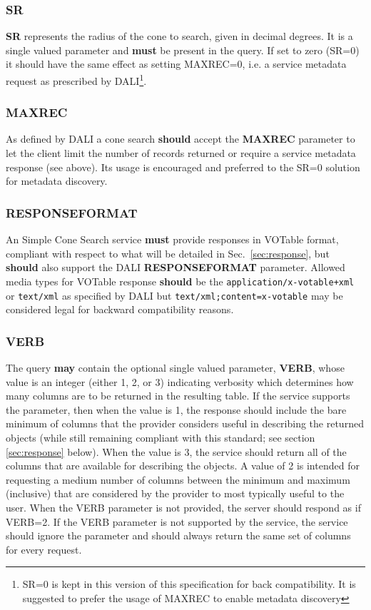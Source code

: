 \documentclass[11pt,a4paper]{ivoa}
\begin{document}
\subsubsection{SR}
\textbf{SR} represents the radius of the cone to search, given in decimal degrees. It is a single valued parameter and \textbf{must} be present in the query. If set to zero (SR=0) it should have the same effect as setting MAXREC=0, i.e. a service metadata request as prescribed by DALI\footnote{SR=0 is kept in this version of this specification for back compatibility. It is suggested to prefer the usage of MAXREC to enable metadata discovery}.

\subsubsection{MAXREC}
As defined by DALI a cone search \textbf{should} accept the \textbf{MAXREC} parameter to let the client limit the number of records returned or require a service metadata response (see above).  Its usage is encouraged and preferred to the SR=0 solution for metadata discovery.

\subsubsection{RESPONSEFORMAT}
\label{subsubsec:responseformat}
An Simple Cone Search service \textbf{must} provide responses in VOTable
\citep{std:VOTABLE} format, compliant with respect to what will be
detailed in Sec.~\ref{sec:response}, but \textbf{should} also support
the DALI \textbf{RESPONSEFORMAT} parameter. Allowed media types for
VOTable response \textbf{should} be the
\texttt{application/x-votable+xml} or \texttt{text/xml} as specified by
DALI but \texttt{text/xml;content=x-votable} may be considered legal for
backward compatibility reasons.

\subsubsection{VERB}
The query \textbf{may} contain the optional single valued parameter, \textbf{VERB}, whose value is an integer (either 1, 2, or 3) indicating verbosity which determines how many columns are to be returned in the resulting table. If the service supports the parameter, then when the value is 1, the response should include the bare minimum of columns that the provider considers useful in describing the returned objects (while still remaining compliant with this standard; see section \ref{sec:response} below). When the value is 3, the service should return all of the columns that are available for describing the objects. A value of 2 is intended for requesting a medium number of columns between the minimum and maximum (inclusive) that are considered by the provider to most typically useful to the user. When the VERB parameter is not provided, the server should respond as if VERB=2. If the VERB parameter is not supported by the service, the service should ignore the parameter and should always return the same set of columns for every request.
\end{document}
